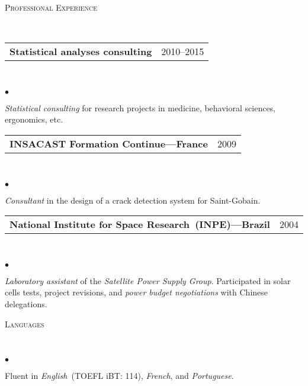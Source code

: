 \documentclass[a4paper,11pt]{article}
\makeatletter
\newcommand{\CVheading}[1]{
	\vspace{10pt}
	{ \large
	\begin{minipage}{\textwidth}
		\textsc{#1 \vphantom{p\^{E}}}
	\end{minipage} } \\
	\vspace{5pt}
}
\newcommand{\CVsubheading}[2]{
	\begin{tabular*}{\textwidth}{l@{\extracolsep{\fill}}r}
		\textbf{#1} & #2 \\
	\end{tabular*} \\
}
\newcommand{\CVlist}{
	\begin{list}{$\bullet$}{
	\setlength{\itemsep}{0pt}
	\setlength{\parsep}{1pt}
	\setlength{\topsep}{1pt}
	\setlength{\partopsep}{0pt}
	\setlength{\leftmargin}{24pt}
	\setlength{\labelwidth}{1em} }
}
\newcommand{\CVlistend}{
	\end{list}
	\vspace{3pt}
}
\makeatother
\begin{document}
\CVheading{Professional Experience}


\CVsubheading{Statistical analyses consulting}{2010--2015}

	\CVlist

	\item
	\textit{Statistical consulting} for research projects in medicine, behavioral sciences, ergonomics, etc.

	\CVlistend


\CVsubheading{INSACAST Formation Continue---France}{2009}

	\CVlist

	\item
	\textit{Consultant} in the design of a crack detection system for Saint-Gobain.

	\CVlistend


\CVsubheading{National Institute for Space Research~(INPE)---Brazil}{2004}

	\CVlist

	\item
	\textit{Laboratory assistant} of the \textit{Satellite Power Supply Group}. Participated in solar cells tests, project revisions, and \emph{power budget negotiations} with Chinese delegations.

	\CVlistend


\CVheading{Languages}
	\vspace{-2pt}
	\CVlist

	\item
	Fluent in \textit{English}~(TOEFL iBT: 114), \textit{French}, and \textit{Portuguese}.

	\CVlistend




%
%
%
%
%
%
%
%
%
\end{document}
